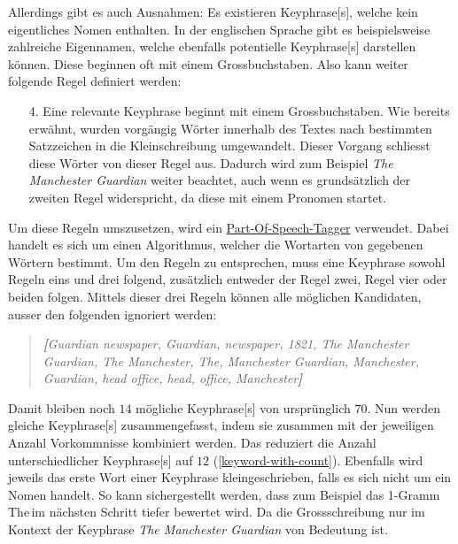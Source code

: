 Allerdings gibt es auch Ausnahmen: Es existieren \gls{Keyphrase}[s], welche kein eigentliches Nomen enthalten. In der englischen Sprache gibt es beispielsweise zahlreiche Eigennamen, welche ebenfalls potentielle \gls{Keyphrase}[s] darstellen können. Diese beginnen oft mit einem Grossbuchstaben. Also kann weiter folgende Regel definiert werden:

\begin{enumerate}
    \item[4.] Eine relevante \gls{Keyphrase} beginnt mit einem Grossbuchstaben. Wie bereits erwähnt, wurden vorgängig Wörter innerhalb des Textes nach bestimmten Satzzeichen in die Kleinschreibung umgewandelt. Dieser Vorgang schliesst diese Wörter von dieser Regel aus. Dadurch wird zum Beispiel \textit{The Manchester Guardian} weiter beachtet, auch wenn es grundsätzlich der zweiten Regel widerspricht, da diese mit einem Pronomen startet. 
\end{enumerate}

Um diese Regeln umszusetzen, wird ein \hyperref[part-of-speech]{Part-Of-Speech-Tagger} verwendet. Dabei handelt es sich um einen Algorithmus, welcher die Wortarten von gegebenen Wörtern bestimmt. Um den Regeln zu entsprechen, muss eine \gls{Keyphrase} sowohl Regeln eins und drei folgend, zusätzlich entweder der Regel zwei, Regel vier oder beiden folgen. Mittels dieser drei Regeln können alle möglichen Kandidaten, ausser den folgenden ignoriert werden:

\begin{quote}
\textit{\textbf{[}Guardian newspaper, Guardian, newspaper, 1821, The Manchester Guardian, The Manchester, The, Manchester Guardian, Manchester, Guardian, head office, head, office, Manchester\textbf{]}}
\end{quote}

Damit bleiben noch $14$ mögliche \gls{Keyphrase}[s] von ursprünglich $70$. Nun werden gleiche \gls{Keyphrase}[s] zusammengefasst, indem sie zusammen mit der jeweiligen Anzahl Vorkommnisse kombiniert werden. Das reduziert die Anzahl unterschiedlicher \gls{Keyphrase}[s] auf $12$ (\autoref{keyword-with-count}). Ebenfalls wird jeweils das erste Wort einer \gls{Keyphrase} kleingeschrieben, falls es sich nicht um ein Nomen handelt. So kann sichergestellt werden, dass zum Beispiel das 1-Gramm \glqq The\grqq\,im nächsten Schritt tiefer bewertet wird. Da die Grossschreibung nur im Kontext der \gls{Keyphrase} \textit{The Manchester Guardian} von Bedeutung ist.

